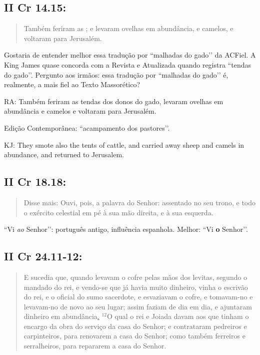 \subsection{II Cr 14.15:}
\begin{quote}
    \small
 Também feriram as ; e levaram ovelhas em abundância, e camelos, e voltaram para Jerusalém.
 \end{quote}

Gostaria de entender melhor essa tradução por ``malhadas do gado’’ da ACFiel. A King James quase concorda com a Revista e Atualizada quando registra ``tendas do gado’’. Pergunto aos irmãos: essa tradução por ``malhadas do gado’’ é, realmente, a mais fiel ao Texto Massorético?

RA: Também feriram as tendas dos donos do gado, levaram ovelhas em abundância e camelos e voltaram para Jerusalém.

Edição Contemporânea: ``acampamento dos pastores’’.

KJ: They smote also the tents of cattle, and carried away sheep and camels in abundance, and returned to Jerusalem.

\subsection{II Cr 18.18:}
\begin{quote}
    \small
Disse mais: Ouvi, pois, a palavra do Senhor:   assentado no seu trono, e todo o exército  celestial em pé à sua mão direita, e à sua esquerda.
\end{quote}
 
``Vi \emph{ao} Senhor’’: português antigo, influência  espanhola. Melhor: ``Vi \textbf{o} Senhor’’.

\subsection{II Cr 24.11-12:}
\begin{quote}
    \small
E sucedia que, quando levavam o cofre pelas mãos dos levitas, segundo o mandado do rei, e vendo-se que já havia muito dinheiro, vinha o escrivão do rei, e o oficial do sumo sacerdote, e esvaziavam o cofre, e tomavam-no e levavam-no de novo ao seu lugar; assim faziam de dia em dia, e ajuntaram dinheiro em abundância\uline{.} $^{\mathrm{12}}$O qual o rei e Joiada davam aos que tinham o encargo da obra do serviço da casa do Senhor; e contrataram pedreiros e carpinteiros, para renovarem a casa do Senhor; como também ferreiros e serralheiros, para repararem a casa do Senhor.
 \end{quote}
 
